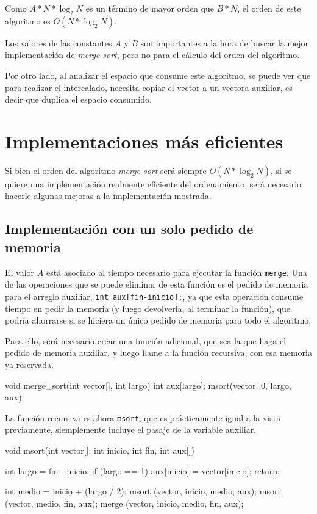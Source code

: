 Como $A*N*\log_2N$ es un término de mayor orden que $B*N$, el orden de este
algoritmo es $O(N*\log_2N)$.

Los valores de las constantes $A$ y $B$ son importantes a la hora de buscar
la mejor implementación de \textit{merge sort}, pero no para el cálculo del
orden del algoritmo.

Por otro lado, al analizar el espacio que consume este algoritmo, se puede
ver que para realizar el intercalado, necesita copiar el vector a un
vectora auxiliar, es decir que duplica el espacio consumido.

\section{Implementaciones más eficientes}

Si bien el orden del algoritmo \textit{merge sort} será siempre
$O(N*\log_2N)$, si se quiere una implementación realmente eficiente del
ordenamiento, será necesario hacerle algunas mejoras a la implementación
mostrada.

\subsection{Implementación con un solo pedido de memoria}

El valor $A$ está asociado al tiempo necesario para ejecutar la función
\lstinline!merge!. Una de las operaciones que se puede eliminar de esta
función es el pedido de memoria para el arreglo auxiliar,
\lstinline!int aux[fin-inicio];!, ya que esta operación consume tiempo en
pedir la memoria (y luego devolverla, al terminar la función), que podría
ahorrarse si se hiciera un único pedido de memoria para todo el algoritmo.

Para ello, será necesario crear una función adicional, que sea la que haga
el pedido de memoria auxiliar, y luego llame a la función recursiva, con
esa memoria ya reservada.

\begin{codigo-c}
void merge_sort(int vector[], int largo)
{
    int aux[largo];
    msort(vector, 0, largo, aux);
}
\end{codigo-c}

La función recursiva es ahora \lstinline!msort!, que es prácticamente igual
a la vista previamente, siemplemente incluye el pasaje de la variable
auxiliar.

\begin{codigo-c}
void msort(int vector[], int inicio, int fin, int aux[])
{
    int largo = fin - inicio;
    if (largo == 1) {
        aux[inicio] = vector[inicio];
        return;
    }

    int medio = inicio + (largo / 2);
    msort (vector, inicio, medio, aux);
    msort (vector, medio, fin, aux);
    merge (vector, inicio, medio, fin, aux);
}
\end{codigo-c}

